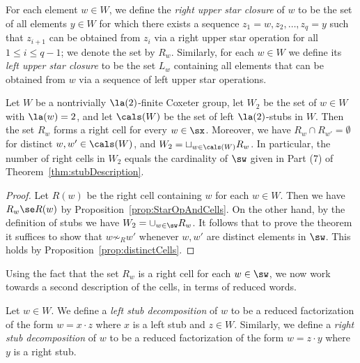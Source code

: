 \begin{definition}
    \label{def:closure}
    For each element $w\in W$, we define the \emph{right upper star closure} of $w$ to be the set of
    all elements $y\in W$ for which there exists a sequence $z_1=w, z_2,\dots, z_q=y$ such that
    $z_{i+1}$ can be obtained from $z_{i}$ via a right upper star operation for all $1\le i\le q-1$;
    we denote the set by $R_w$. Similarly, for each $w\in W$ we define its \emph{left upper star
    closure} to be the set $L_w$ containing all elements that can be obtained from $w$ via a
    sequence of left upper star operations.
\end{definition}

\begin{thm}
    \label{thm:cellParameterization}
    Let $W$ be a nontrivially $\la(2)$-finite Coxeter group, let $W_2$ be the set of $w\in W$ with $\la(w)=2$, and let
    $\cals(W)$ be the set of left $\la(2)$-stubs in $W$.  Then the set $R_w$ forms a right \kl cell
    for every $w\in \sx$.  Moreover, we have  $R_w\cap R_{w'}=\emptyset$ for distinct
    $w,w'\in\cals(W)$, and $W_2=\sqcup_{w\in \cals(W)}R_w$. In particular, the number of right cells
    in $W_2$ equals the cardinality of $\sw$ given in Part \textup{(}7\textup{)} of
    Theorem~\ref{thm:stubDescription}.
\end{thm}

\begin{proof}
    Let $R(w)$ be the right \kl cell containing $w$ for each $w\in W$. Then we have $R_w\se R(w)$ by
    Proposition~\ref{prop:StarOpAndCells}.  On the other hand, by the definition of stubs we have
    $W_2=\cup_{w\in \sw} R_w$.  It follows that to prove the theorem it suffices to show that
    $w\not\sim_R w'$ whenever $w,w'$ are distinct elements in $\sw$. This holds by
    Proposition~\ref{prop:distinctCells}.
\end{proof}

Using the fact that the set $R_w$ is a right cell for each $w\in\sw$, we now work towards a second
description of the cells, in terms of reduced words.  


\begin{definition}
    \label{def:stubDecomp}
    Let $w\in W$. We define a \emph{left stub decomposition} of $w$ to be a reduced factorization of
    the form $w=x\cdot z$ where $x$ is a left stub and $z\in W$.  Similarly, we define a \emph{right
    stub decomposition} of $w$ to be a reduced factorization of the form $w=z\cdot y$ where $y$ is a
    right stub.  
\end{definition}

